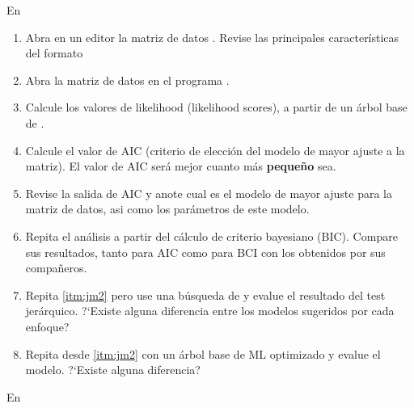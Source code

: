 

En 


\begin{enumerate}
	\item Abra en un editor la matriz de datos . Revise las principales caracter\'isticas del formato 

	\item Abra la matriz de datos en el programa .
	
	\item\label{itm:jm2} Calcule los valores de likelihood (likelihood scores), a partir de un \'arbol base de . 
	
	\item Calcule el valor de AIC (criterio de elecci\'on del modelo de mayor ajuste a la matriz). El valor de AIC ser\'a mejor cuanto m\'as \textbf{peque\~no} sea.
	
	\item Revise la salida de AIC y anote cual es el modelo de mayor ajuste para la matriz de datos, asi como los par\'ametros de este modelo.
	
	\item Repita el an\'alisis a partir del c\'alculo de criterio bayesiano (BIC). Compare sus resultados, tanto para AIC como para BCI con los obtenidos por sus compa\~neros.

	\item Repita \ref{itm:jm2}  pero use una b\'usqueda de  y evalue el resultado del test jer\'arquico. ?`Existe alguna diferencia entre los modelos sugeridos por cada enfoque? 

	\item Repita desde \ref{itm:jm2} con un \'arbol base de ML optimizado y evalue el modelo. ?`Existe alguna diferencia?
\end{enumerate}



En 


